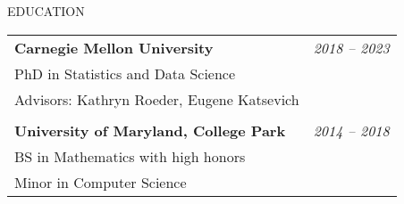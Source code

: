 \documentclass{resume} %
\begin{document}

\begin{rSection}{EDUCATION}

\begin{tabular}{p{14cm}R{2.5cm}}
	\bf{Carnegie Mellon University}  &  \it{2018 -- 2023}  \\ 
	PhD in Statistics and Data Science &  \\ Advisors: Kathryn Roeder, Eugene Katsevich  & \\ &\\
	\textbf{University of Maryland, College Park} & \it{2014 -- 2018}
	 \\  BS in Mathematics with high honors & \\
	 Minor in Computer Science
\end{tabular} 
\end{rSection}





\end{document}
